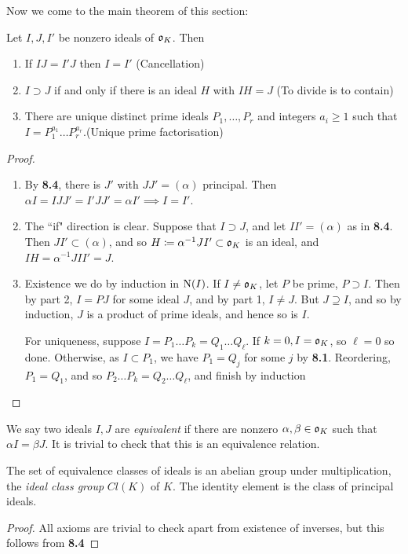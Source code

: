 \documentclass[10pt,a4paper]{article}
\begin{document}
Now we come to the main theorem of this section:
\begin{theorem}
Let $I,J,I'$ be nonzero ideals of $\mathfrak{o}_K$. Then
\begin{enumerate}
\item If $IJ = I'J$ then $I = I'$ \hfill(Cancellation)
\item $I \supset J$ if and only if there is an ideal $H$ with $IH = J$ \hfill(To divide is to contain)
\item There are unique distinct prime ideals $P_1, \ldots, P_r$ and integers $a_i \geq 1$ such that $I = P_1^{a_1}\ldots P_r^{a_r}$.\hfill(Unique prime factorisation)
\end{enumerate}
\end{theorem}
\begin{proof}
\item
\begin{enumerate}
\item By \textbf{8.4}, there is $J'$ with $JJ' = (\alpha)$ principal. Then $\alpha I = IJJ' = I'JJ' = \alpha I' \implies I = I'$.
\item The ``if" direction is clear. Suppose that $I \supset J$, and let $II' = (\alpha)$ as in \textbf{8.4}. Then $JI' \subset (\alpha)$, and so $H \coloneqq \alpha^{-1}JI' \subset \mathfrak{o}_K$ is an ideal, and $IH=\alpha^{-1}JII' = J$.
\item Existence we do by induction in $\operatorname{N}(I)$. If $I \neq \mathfrak{o}_K$, let $P$ be prime, $P \supset I$. Then by part 2, $I = PJ$ for some ideal $J$, and by part 1, $I \neq J$. But $J \supseteq I$, and so by induction, $J$ is a product of prime ideals, and hence so is $I$.

For uniqueness, suppose $I = P_1\ldots P_k = Q_1\ldots Q_{\ell}$. If $k=0, I = \mathfrak{o}_K$, so $\ell = 0$ so done. Otherwise, as $I \subset P_1$, we have $P_1 = Q_j$ for some $j$ by \textbf{8.1}.  Reordering, $P_1 = Q_1$, and so $P_2\ldots P_k = Q_2\ldots Q_\ell$, and finish by induction 
\end{enumerate}
\end{proof}
We say two ideals $I,J$ are \emph{equivalent} if there are nonzero $\alpha, \beta \in \mathfrak{o}_K$ such that $\alpha I = \beta J$. It is trivial to check that this is an equivalence relation. 

\begin{theorem}
The set of equivalence classes of ideals is an abelian group under multiplication, the \emph{ideal class group} $Cl(K)$ of $K$. The identity element is the class of principal ideals.
\end{theorem}
\begin{proof}
All axioms are trivial to check apart from existence of inverses, but this follows from \textbf{8.4}
\end{proof}
\end{document}
